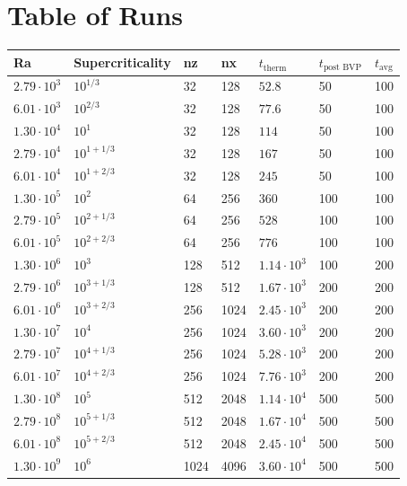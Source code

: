 \documentclass[aps, pre, onecolumn, nofootinbib, notitlepage, groupedaddress, amsfonts, amssymb, amsmath, longbibliography]{revtex4-1}
\begin{document}
\section{Table of Runs}
\begin{center}
\begin{tabularx}{\textwidth}{ X X X X X X X }
\hline													
Ra	&	Supercriticality	&	nz	&	nx	&	$t_{\text{therm}}$	&	$t_{\text{post BVP}}$	&	$t_{\text{avg}}$	\\[1ex]
\hline		\hline											
$2.79 \cdot 10^3$	&	$10^{1/3}$	&	32	&	128	&	$52.8$	&	50	&	100	\\
$6.01 \cdot 10^3$	&	$10^{2/3}$	&	32	&	128	&	$77.6$	&	50	&	100	\\
$1.30 \cdot 10^4$	&	$10^1$	&	32	&	128	&	$114$	&	50	&	100	\\
$2.79 \cdot 10^4$	&	$10^{1 + 1/3}$	&	32	&	128	&	$167$	&	50	&	100	\\
$6.01 \cdot 10^4$	&	$10^{1 + 2/3}$	&	32	&	128	&	$245$	&	50	&	100	\\
$1.30 \cdot 10^5$	&	$10^2$	&	64	&	256	&	$360$	&	100	&	100	\\
$2.79 \cdot 10^5$	&	$10^{2 + 1/3}$	&	64	&	256	&	$528$	&	100	&	100	\\
$6.01 \cdot 10^5$	&	$10^{2 + 2/3}$	&	64	&	256	&	$776$	&	100	&	100	\\
$1.30 \cdot 10^6$	&	$10^3$	&	128	&	512	&	$1.14 \cdot 10^3$	&	100	&	200	\\
$2.79 \cdot 10^6$	&	$10^{3 + 1/3}$	&	128	&	512	&	$1.67 \cdot 10^3$	&	200	&	200	\\
$6.01 \cdot 10^6$	&	$10^{3 + 2/3}$	&	256	&	1024	&	$2.45 \cdot 10^3$	&	200	&	200	\\
$1.30 \cdot 10^7$	&	$10^4$	&	256	&	1024	&	$3.60 \cdot 10^3$	&	200	&	200	\\
$2.79 \cdot 10^7$	&	$10^{4 + 1/3}$	&	256	&	1024	&	$5.28 \cdot 10^3$	&	200	&	200	\\
$6.01 \cdot 10^7$	&	$10^{4 + 2/3}$	&	256	&	1024	&	$7.76 \cdot 10^3$	&	200	&	200	\\
$1.30 \cdot 10^8$	&	$10^5$	&	512	&	2048	&	$1.14 \cdot 10^4$	&	500	&	500	\\
$2.79 \cdot 10^8$	&	$10^{5 + 1/3}$	&	512	&	2048	&	$1.67 \cdot 10^4$	&	500	&	500	\\
$6.01 \cdot 10^8$	&	$10^{5 + 2/3}$	&	512	&	2048	&	$2.45 \cdot 10^4$	&	500	&	500	\\
$1.30 \cdot 10^9$	&	$10^6$	&	1024	&	4096	&	$3.60 \cdot 10^4$	&	500	&	500	\\
\hline													
\end{tabularx}
\end{center}




\end{document}
